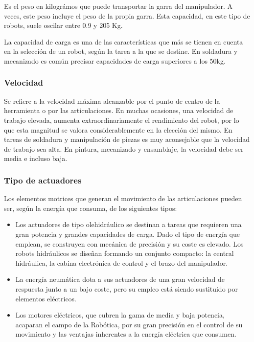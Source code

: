 \documentclass[12pt,a4papert,woside,openright,titlepage,final]{book}
\begin{document}
Es el peso en kilográmos que puede transportar la garra del manipulador. A
veces, este peso incluye el peso de la propia garra. Esta capacidad, en este
tipo de robots, suele oscilar entre 0.9 y 205 Kg. 

La capacidad de carga es una de las características que más se tienen en
cuenta en la selección de un robot, según la tarea a la que se destine. En
soldadura y mecanizado es común precisar capacidades de carga superiores a los
50kg.


\subsubsection{Velocidad}

Se refiere a la velocidad máxima alcanzable por el punto de centro de la
herramienta o por las articulaciones.
En muchas ocasiones, una velocidad de trabajo elevada, aumenta
extraordinariamente el rendimiento del robot, por lo que esta magnitud se valora
considerablemente en la elección del mismo. En tareas de soldadura y
manipulación de piezas es muy aconsejable que la velocidad de trabajo sea alta.
En pintura, mecanizado y ensamblaje, la velocidad debe ser media e incluso baja.


\subsubsection{Tipo de actuadores}

Los elementos motrices que generan el movimiento de las articulaciones pueden
ser, según la energía que consuma, de los siguientes tipos:

\begin{itemize}
    \item Los actuadores de tipo olehidráulico se destinan a tareas que requieren una gran
    potencia y grandes capacidades de carga. Dado el tipo de energía que emplean, se
    construyen con mecánica de precisión y su coste es elevado. Los robots
    hidráulicos se diseñan formando un conjunto compacto: la central hidráulica, la
    cabina electrónica de control y el brazo del manipulador.
    \item La energía neumática dota a sus actuadores de una gran velocidad de respuesta
    junto a un bajo coste, pero su empleo está siendo sustituido por elementos
    eléctricos.
    \item Los motores eléctricos, que cubren la gama de media y baja potencia, acaparan el
    campo de la Robótica, por su gran precisión en el control de su movimiento y las
    ventajas inherentes a la energía eléctrica que consumen.
\end{itemize}
\end{document}
